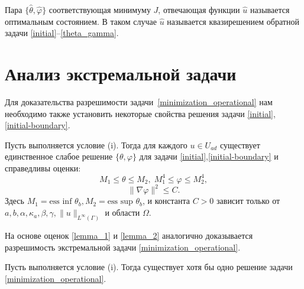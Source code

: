 \documentclass[10pt]{article}
\begin{document}
    Пара $\{\hat{\theta}, \hat{\varphi} \}$ соответствующая минимуму $J$, отвечающая функции $\hat{u}$ называется оптимальным состоянием. В таком случае $\hat{u}$ называется квазирешением обратной задачи \eqref{initial}--\eqref{theta_gamma}.

    \section{Анализ экстремальной задачи}
    \label{sec:optimality}

    Для доказательства разрешимости задачи~\eqref{minimization_operational} нам необходимо также установить некоторые свойства решения задачи \eqref{initial}, \eqref{initial-boundary}.

    \begin{lem}
        \label{SolvabilityLemma}
        Пусть выполняется условие (i). Тогда для каждого $ u \in U_{ad} $ существует единственное слабое решение $\{\theta, \varphi \}$ для задачи \eqref{initial},\eqref{initial-boundary} и справедливы оценки:
        \begin{equation}
            \label{lemma_1}
            M_1 \le \theta \le M_2, \; M_1^4 \le \varphi \le M_2^4,
        \end{equation}
        \begin{equation}
            \label{lemma_2}
            \| \nabla \varphi \|^2 \le C.
        \end{equation}
        Здесь $M_1 = \text{ess inf } \theta_b, M_2 = \text{ess sup } \theta_b$, и константа $C > 0$ зависит только от \\ $a, b, \alpha, \kappa_a, \beta, \gamma, \|u\|_{L^\infty(\Gamma)}$ и области $\Omega$.
    \end{lem}

    На основе оценок \eqref{lemma_1} и \eqref{lemma_2} аналогично \cite{cheb_origin} доказывается разрешимость экстремальной задачи \eqref{minimization_operational}.
    \begin{thm}
        Пусть выполняется условие (i). Тогда существует хотя бы одно решение задачи \eqref{minimization_operational}.
    \end{thm}
\end{document}
